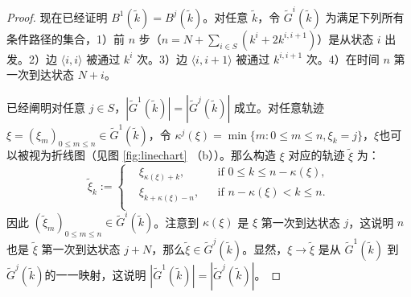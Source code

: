 \begin{appendices}
\begin{proof}
    现在已经证明 $B^1(\tilde{k})=B^j(\tilde{k})$。对任意 $\tilde{k}$，令 $\tilde{G}^i(\tilde{k})$ 为满足下列所有条件路径的集合，1）前 $n$ 步（$n=N+\sum_{i \in S}(k^i+2k^{i,i+1})$）是从状态 $i$ 出发。2）边 $\langle i,i\rangle$ 被通过 $k^i$ 次。3）边 $\langle i,i+1\rangle$ 被通过 $k^{i,i+1}$ 次。4）在时间 $n$ 第一次到达状态 $N+i$。

    已经阐明对任意 $j\in S$，$|\tilde{G}^1(\tilde{k})|=|\tilde{G}^j(\tilde{k})|$ 成立。对任意轨迹 $\xi=(\xi_m)_{0\le m\le n}\in \tilde{G}^{1}(\tilde{k})$，令 $\kappa^j(\xi)=\min\{m: 0\le m\le n,\xi_k=j\}$，$\xi$也可以被视为折线图（见图 \ref{fig:linechart} （b））。那么构造 $\xi$ 对应的轨迹 $\tilde{\xi}$ 为：
    \begin{equation*}
		\tilde{\xi}_k
		:=\left\{\begin{aligned}
			&\xi_{\kappa(\xi)+k},    && \text{if } 0\le k\le n-\kappa(\xi),\\
			&\xi_{k+\kappa(\xi)-n},    && \text{if }n-\kappa(\xi)<k\le n.\\
		\end{aligned}\right.
	\end{equation*}
    因此 $(\tilde{\xi}_m)_{0\le m\le n} \in \tilde{G}^i(\tilde{k})$。注意到 $\kappa(\xi)$ 是 $\xi$ 第一次到达状态 $j$，这说明 $n$ 也是 $\tilde{\xi}$ 第一次到达状态 $j+N$，那么$\tilde{\xi}\in \tilde{G}^j(\tilde{k})$。显然，$\xi\to\tilde{\xi}$ 是从 $\tilde{G}^1(\tilde{k})$ 到 $\tilde{G}^j(\tilde{k})$的一一映射，这说明 $|\tilde{G}^1(\tilde{k})|=|\tilde{G}^j(\tilde{k})|$。


\end{proof}
\end{appendices}
